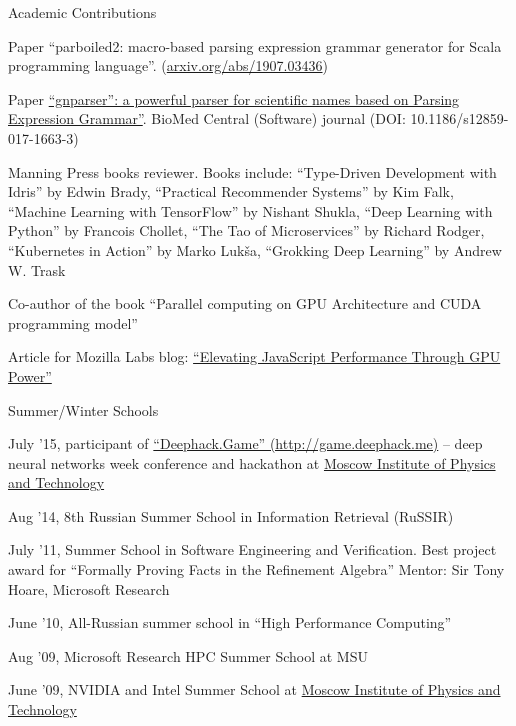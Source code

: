 \documentclass{resume} %
\begin{document}
\begin{rSubsectionSchools}{Academic Contributions}
\item Paper ``parboiled2: macro-based parsing expression grammar generator for Scala programming
language''. (\href{https://arxiv.org/abs/1907.03436}{arxiv.org/abs/1907.03436})
\item Paper \href{https://bmcbioinformatics.biomedcentral.com/articles/10.1186/s12859-017-1663-3}
{``gnparser'': a powerful parser for scientific names based on Parsing Expression Grammar''}.
BioMed Central (Software) journal (DOI: 10.1186/s12859-017-1663-3)
\item Manning Press books reviewer. Books include:
``Type-Driven Development with Idris'' by Edwin Brady,
``Practical Recommender Systems'' by Kim Falk,
``Machine Learning with TensorFlow'' by Nishant Shukla,
``Deep Learning with Python'' by Francois Chollet,
``The Tao of Microservices'' by Richard Rodger,
``Kubernetes in Action'' by Marko Lukša,
``Grokking Deep Learning'' by Andrew W. Trask
\item Co-author of the book ``Parallel computing on GPU Architecture and CUDA programming  model''
\item Article for Mozilla Labs blog:
\href{https://blog.mozilla.org/labs/2010/01/elevating-javascript-performance-through-gpu-power/}{``Elevating JavaScript Performance Through GPU Power''}
\end{rSubsectionSchools}


\begin{rSubsectionSchools}{Summer/Winter Schools}
\item July '15, participant of \href{http://game.deephack.me/}{``Deephack.Game''
(http://game.deephack.me)} -- deep neural
networks week conference and hackathon at \href{http://mipt.ru/}{Moscow Institute of Physics and
Technology}
\item Aug '14, 8th Russian Summer School in Information Retrieval (RuSSIR)
\item July '11, Summer School in Software Engineering and Verification. Best project award for
``Formally Proving Facts in the Refinement Algebra'' Mentor: Sir Tony Hoare, Microsoft Research
\item June '10, All-Russian summer school in ``High Performance Computing''
\item Aug '09, Microsoft Research HPC Summer School at MSU
\item June '09, NVIDIA and Intel Summer School at \href{http://mipt.ru/}{Moscow Institute of
Physics and
Technology}
\end{rSubsectionSchools}
\end{document}
